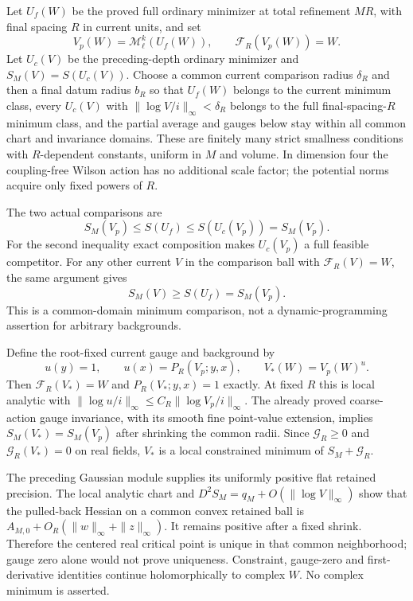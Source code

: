 \documentclass[11pt]{article}
\theoremstyle{remark}
\begin{document}
Let $U_f(W)$ be the proved full ordinary minimizer at total
refinement $MR$, with final spacing $R$ in current units, and set
\begin{equation}\label{cmi-pregauge}
 V_p(W)=\mathcal M_\ell^k(U_f(W)),\qquad
 \mathcal F_R(V_p(W))=W.
\end{equation}
Let $U_c(V)$ be the preceding-depth ordinary minimizer and
$S_M(V)=S(U_c(V))$. Choose a common current comparison radius
$\delta_R$ and then a final datum radius $b_R$ so that
$U_f(W)$ belongs to the current minimum class, every $U_c(V)$
with $\|\log V/i\|_\infty<\delta_R$ belongs to the full
final-spacing-$R$ minimum class, and the partial average and
gauges below stay within all common chart and invariance domains.
These are finitely many strict smallness conditions with
$R$-dependent constants, uniform in $M$ and volume. In dimension
four the coupling-free Wilson action has no additional scale
factor; the potential norms acquire only fixed powers of $R$.

The two actual comparisons are
\begin{equation}\label{cmi-two-comparisons}
 S_M(V_p)\le S(U_f)
       \le S(U_c(V_p))=S_M(V_p).
\end{equation}
For the second inequality exact composition makes $U_c(V_p)$
a full feasible competitor. For any other current $V$ in the
comparison ball with $\mathcal F_R(V)=W$, the same argument gives
\begin{equation}\label{cmi-current-minimum}
 S_M(V)\ge S(U_f)=S_M(V_p).
\end{equation}
This is a common-domain minimum comparison, not a
dynamic-programming assertion for arbitrary backgrounds.

Define the root-fixed current gauge and background by
\begin{equation}\label{cmi-rooted-background}
 u(y)=1,\qquad u(x)=P_R(V_p;y,x),\qquad V_*(W)=V_p(W)^u.
\end{equation}
Then $\mathcal F_R(V_*)=W$ and $P_R(V_*;y,x)=1$ exactly.
At fixed $R$ this is local analytic with
$\|\log u/i\|_\infty\le C_R\|\log V_p/i\|_\infty$.
The already proved coarse-action gauge invariance, with its
smooth fine point-value extension, implies $S_M(V_*)=S_M(V_p)$
after shrinking the common radii. Since $\mathcal G_R\ge0$
and $\mathcal G_R(V_*)=0$ on real fields, $V_*$ is a local
constrained minimum of $S_M+\mathcal G_R$.

The preceding Gaussian module supplies its uniformly positive
flat retained precision. The local analytic chart and
$D^2S_M=q_M+O(\|\log V\|_\infty)$ show that the pulled-back
Hessian on a common convex retained ball is
$A_{M,0}+O_R(\|w\|_\infty+\|z\|_\infty)$. It remains positive
after a fixed shrink. Therefore the centered real critical
point is unique in that common neighborhood; gauge zero
alone would not prove uniqueness. Constraint, gauge-zero and
first-derivative identities continue holomorphically to complex
$W$. No complex minimum is asserted.
\end{document}
